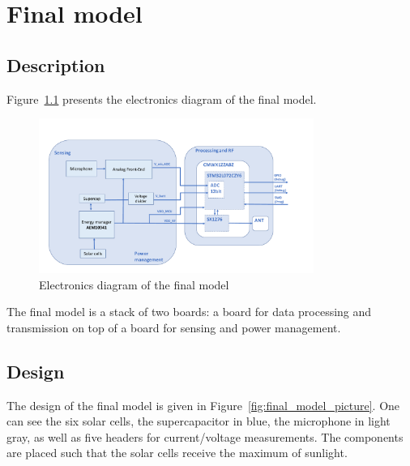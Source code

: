 \documentclass{EPL-master-thesis-covers-EN}
\begin{document}
\chapter{Final model}

\section{Description}

Figure~\ref{fig:electronics_diagram} presents the electronics diagram of the final model.

\begin{figure}[H]
    \centering
    \includegraphics[width=0.8\textwidth]{electronics_diagram.pdf}
    \caption{Electronics diagram of the final model}
    \label{fig:electronics_diagram}
\end{figure}

The final model is a stack of two boards: a board for data processing and transmission on top of a board for sensing and power management.

\section{Design}

The design of the final model is given in Figure~\ref{fig:final_model_picture}. One can see the six solar cells, the supercapacitor in blue, the microphone in light gray, as well as five headers for current/voltage measurements. The components are placed such that the solar cells receive the maximum of sunlight.
\end{document}
